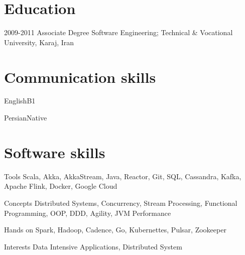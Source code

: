 \documentclass{tccv}
\begin{document}
\section{Education}

\begin{yearlist}

\item{2009-2011}
  {Associate Degree}
  {Software Engineering; Technical \& Vocational University, Karaj, Iran}

\end{yearlist}

\section{Communication skills}

\begin{factlist}
  \item{English}{B1}
  \item{Persian}{Native}
\end{factlist}

\section{Software skills}

\begin{factlist}

\item{Tools}
  {Scala, Akka, AkkaStream, Java, Reactor, Git, SQL, Cassandra, Kafka, Apache Flink, Docker, Google Cloud}

\item{Concepts}
  {Distributed Systems, Concurrency, Stream Processing,
  Functional Programming, OOP, DDD, Agility, JVM Performance}

\item{Hands on}
  {Spark, Hadoop, Cadence, Go, Kubernettes, Pulsar, Zookeeper}

\item{Interests}
  {Data Intensive Applications, Distributed System}

\end{factlist}
\end{document}

